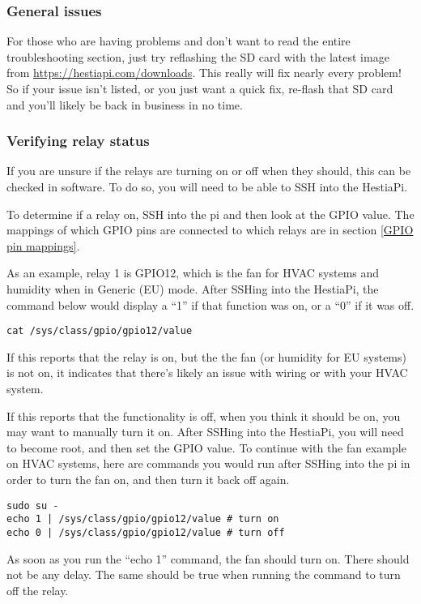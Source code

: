 \subsubsection{General issues}
For those who are having problems and don't want to read the entire
troubleshooting section, just try reflashing the SD card with the latest image
from \url{https://hestiapi.com/downloads}. This really will fix nearly every
problem! So if your issue isn't listed, or you just want a quick fix, re-flash
that SD card and you'll likely be back in business in no time.

\subsubsection{Verifying relay status}
If you are unsure if the relays are turning on or off when they should, this
can be checked in software. To do so, you will need to be able to SSH into the
HestiaPi.

To determine if a relay on, SSH into the pi and then look at the GPIO value.
The mappings of which GPIO pins are connected to which relays are in section
\ref{GPIO pin mappings}.

As an example, relay 1 is GPIO12, which is the fan for HVAC systems and
humidity when in Generic (EU) mode. After SSHing into the HestiaPi, the command
below would display a ``1'' if that function was on, or a ``0'' if it was off.

\texttt{cat /sys/class/gpio/gpio12/value}

If this reports that the relay is on, but the the fan (or humidity for EU
systems) is not on, it indicates that there's likely an issue with wiring or
with your HVAC system.

If this reports that the functionality is off, when you think it should be on,
you may want to manually turn it on. After SSHing into the HestiaPi, you will
need to become root, and then set the GPIO value. To continue with the fan
example on HVAC systems, here are commands you would run after SSHing into the
pi in order to turn the fan on, and then turn it back off again.

\texttt{sudo su -\\
echo 1 | /sys/class/gpio/gpio12/value \# turn on\\
echo 0 | /sys/class/gpio/gpio12/value \# turn off\\
}

As soon as you run the ``echo 1'' command, the fan should turn on. There should
not be any delay. The same should be true when running the command to turn off
the relay.

